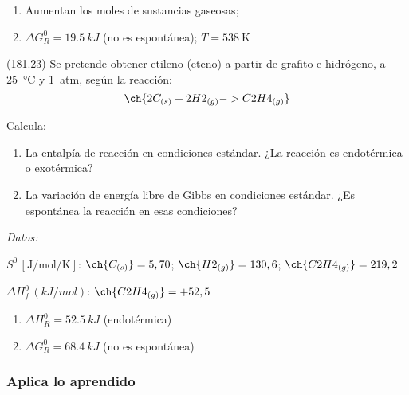 \documentclass[10pt,a5paper,twoside]{article}
\newenvironment{gexdatos}{
      \vspace{4pt}
      \noindent\small\textit{Datos:}
    }{\vspace{5pt}}
\begin{document}
  \begin{solution}
    \begin{enumerate}
      \item Aumentan los moles de sustancias gaseosas; \item \( \Delta G^0_R = \SI{19.5}{kJ} \) (no es espontánea); \( T = \SI{538}{\kelvin} \)
    \end{enumerate}
  \end{solution}




  \begin{exercise}[
      tags    = {},
      topics  = {química, termodinámica, termoquímica},
      source  = {FQ 1B MGH 2016, p181, e23},
    ]
    (181.23) Se pretende obtener etileno (eteno) a partir de grafito e
    hidrógeno, a \SI{25}{\celsius} y \SI{1}{atm}, según la reacción:
    \[  \ch{2 C_{(s)} + 2 H2_{(g)} -> C2H4_{(g)}} \]

    Calcula:
    \begin{enumerate}
      \item La entalpía de reacción en condiciones estándar. ¿La reacción es endotérmica o exotérmica?
      \item La variación de energía libre de Gibbs en condiciones
      estándar. ¿Es espontánea la reacción en esas condiciones?
    \end{enumerate}

    \begin{gexdatos}
      \( S^0\,[\si{\joule\per\mole\per\kelvin}] \):
      \( \ch{C_{(s)}} = 5,70 \);
      \( \ch{H2_{(g)}} = 130,6 \);
      \( \ch{C2H4_{(g)}}= 219,2 \)

      \( \Delta H^0_f\,(\si{kJ/mol}) \):
      \( \ch{C2H4_{(g)}} = +52,5 \)
    \end{gexdatos}
  \end{exercise}

  \begin{solution}
    \begin{enumerate}
      \item \( \Delta H^0_R = \SI{+52.5}{kJ} \) (endotérmica)
      \item \( \Delta G^0_R = \SI{+68.4}{kJ} \) (no es espontánea)
    \end{enumerate}
  \end{solution}






  \subsubsection*{Aplica lo aprendido}
\end{document}
